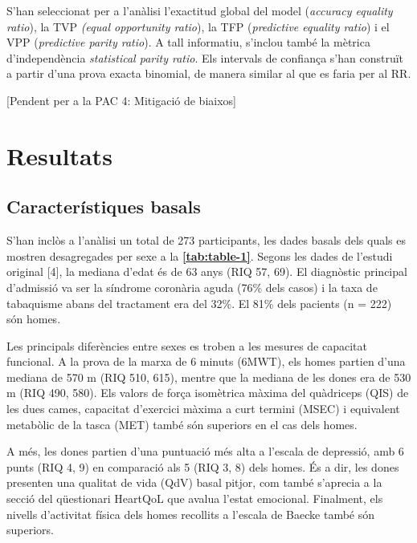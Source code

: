 \documentclass[CAT]{TFUOC}%
\begin{document}
S'han seleccionat per a l'anàlisi l'exactitud global del model (\emph{accuracy equality ratio}), la TVP \emph{(equal opportunity ratio}), la TFP (\emph{predictive equality ratio}) i el VPP (\emph{predictive parity ratio}). A tall informatiu, s'inclou també la mètrica d'independència \emph{statistical parity ratio}. Els intervals de confiança s'han construït a partir d'una prova exacta binomial, de manera similar al que es faria per al RR.

\bigskip

{[}Pendent per a la PAC 4: Mitigació de biaixos{]}

\chapter{Resultats}\label{resultats}

\section{Característiques basals}\label{caracteruxedstiques-basals}

S'han inclòs a l'anàlisi un total de 273 participants, les dades basals dels quals es mostren desagregades per sexe a la \textbf{\autoref{tab:table-1}}. Segons les dades de l'estudi original {[}4{]}, la mediana d'edat és de 63 anys (RIQ 57, 69). El diagnòstic principal d'admissió va ser la síndrome coronària aguda (76\% dels casos) i la taxa de tabaquisme abans del tractament era del 32\%. El 81\% dels pacients (n = 222) són homes.

Les principals diferències entre sexes es troben a les mesures de capacitat funcional. A la prova de la marxa de 6 minuts (6MWT), els homes partien d'una mediana de 570 m (RIQ 510, 615), mentre que la mediana de les dones era de 530 m (RIQ 490, 580). Els valors de força isomètrica màxima del quàdriceps (QIS) de les dues cames, capacitat d'exercici màxima a curt termini (MSEC) i equivalent metabòlic de la tasca (MET) també són superiors en el cas dels homes.

A més, les dones partien d'una puntuació més alta a l'escala de depressió, amb 6 punts (RIQ 4, 9) en comparació als 5 (RIQ 3, 8) dels homes. És a dir, les dones presenten una qualitat de vida (QdV) basal pitjor, com també s'aprecia a la secció del qüestionari HeartQoL que avalua l'estat emocional. Finalment, els nivells d'activitat física dels homes recollits a l'escala de Baecke també són superiors.
\end{document}
